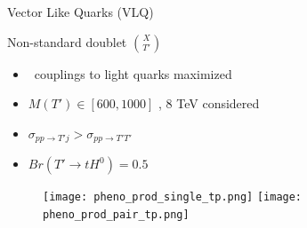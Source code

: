 \begin{frame}{Vector Like Quarks (VLQ)}
\vspace{-.2cm}
\begin{center}
\end{center}


\end{frame}


\begin{frame}{Non-standard doublet $\binom{X}{T'}$}
\vspace{-.3cm}

\begin{block}{}
\begin{itemize}\scriptsize
\item \Tp~couplings to light quarks maximized
\item $M(T')\in [600,1000]$ \GeVcc, 8 TeV considered
\item $\sigma_{pp\to T'j} > \sigma_{pp\to T'T'}$
\item $Br(T' \to tH^{0})=0.5$
\end{itemize}
\end{block}

\vspace{.3cm}
\begin{figure}[!Hhtbp]
  \begin{center}
    \texttt{[image: pheno\_prod\_single\_tp.png]}
    \texttt{[image: pheno\_prod\_pair\_tp.png]}
  \end{center}
\end{figure}

\end{frame}


